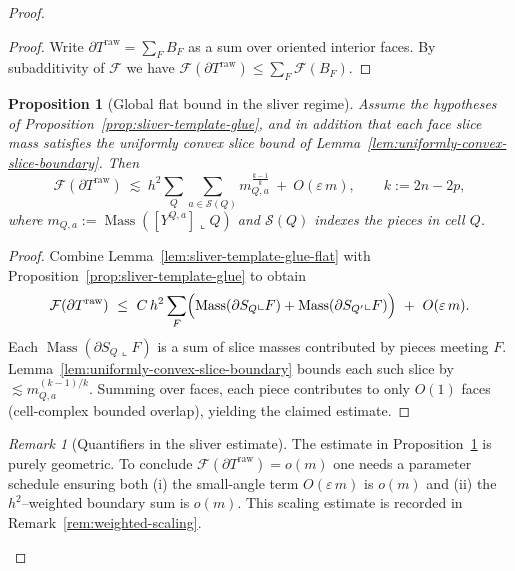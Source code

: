 \documentclass[11pt]{article}
\numberwithin{equation}{section}  %
\theoremstyle{plain}
\newtheorem{proposition}[theorem]{Proposition}
\theoremstyle{definition}
\theoremstyle{remark}
\newtheorem{remark}[theorem]{Remark}
\DeclareMathOperator{\Mass}{Mass}
\begin{document}
\begin{proof}
\begin{proof}
Write $\partial T^{\mathrm{raw}}=\sum_F B_F$ as a sum over oriented interior faces.
By subadditivity of $\mathcal F$ we have $\mathcal F(\partial T^{\mathrm{raw}})\le \sum_F \mathcal F(B_F)$.
\end{proof}


\begin{proposition}[Global flat bound in the sliver regime]\label{prop:sliver-template-global}
Assume the hypotheses of Proposition~\ref{prop:sliver-template-glue}, and in addition that each face slice mass satisfies
the uniformly convex slice bound of Lemma~\ref{lem:uniformly-convex-slice-boundary}.
Then
\[
\mathcal F(\partial T^{\mathrm{raw}})\ \lesssim\ h^2\sum_Q\sum_{a\in\mathcal S(Q)} m_{Q,a}^{\frac{k-1}{k}}\ +\ O(\varepsilon\,m),
\qquad k:=2n-2p,
\]
where $m_{Q,a}:=\Mass([Y^{Q,a}]\llcorner Q)$ and $\mathcal S(Q)$ indexes the pieces in cell $Q$.
\end{proposition}

\begin{proof}
Combine Lemma~\ref{lem:sliver-template-glue-flat} with Proposition~\ref{prop:sliver-template-glue} to obtain
\[
\mathcal F(\partial T^{\mathrm{raw}})\ \le\ C\,h^2\sum_F\Bigl(\Mass(\partial S_Q\llcorner F)+\Mass(\partial S_{Q'}\llcorner F)\Bigr)\ +\ O(\varepsilon\,m).
\]
Each $\Mass(\partial S_Q\llcorner F)$ is a sum of slice masses contributed by pieces meeting $F$.
Lemma~\ref{lem:uniformly-convex-slice-boundary} bounds each such slice by $\lesssim m_{Q,a}^{(k-1)/k}$.
Summing over faces, each piece contributes to only $O(1)$ faces (cell-complex bounded overlap), yielding the claimed estimate.
\end{proof}


\begin{remark}[Quantifiers in the sliver estimate]\label{rem:sliver-quantifier-remark}
The estimate in Proposition~\ref{prop:sliver-template-global} is purely geometric.
To conclude $\mathcal F(\partial T^{\mathrm{raw}})=o(m)$ one needs a parameter schedule ensuring both
(i) the small-angle term $O(\varepsilon\,m)$ is $o(m)$ and (ii) the $h^2$--weighted boundary sum is $o(m)$.
This scaling estimate is recorded in Remark~\ref{rem:weighted-scaling}.
\end{remark}




\end{proof}
\end{document}
